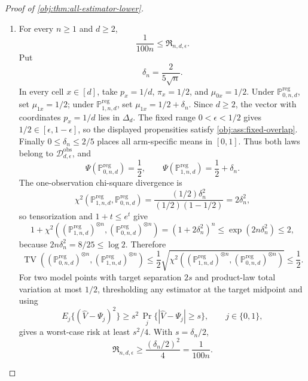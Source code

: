 \documentclass[11pt]{article}
\begin{document}
\begin{proof}[Proof of \cref{obj:thm:all-estimator-lower}]
\begin{enumerate}
Choose \(d_{\log}\) so that
\[
r\ge d_{\log}\quad\Longrightarrow\quad L_r\le\frac r2,
\]
and choose \(n_{\mathrm{tail}}\ge2\) so that, for every
\(n\ge n_{\mathrm{tail}}\),
\[
8\exp\{-n(1-\log2)\}\le\frac{\gamma_{\mathrm{JHW}}}{2n},
\qquad
8\exp\{-n(1-\log2)\}\le\frac{\gamma_{\mathrm{JHW}}}{2}.
\]
Set
\[
d_\star=\max\{d_{\mathrm{dense}},d_{\log}\},
\qquad
\Xi_\star=\max\{d_\star,n_{\mathrm{tail}}\},
\]
and
\[
c_\epsilon=
\min\left\{
\gamma_{\mathrm{dense},\epsilon},
\frac{\gamma_{\mathrm{JHW}}}{64},
\frac{1}{100\Xi_\star}
\right\}>0.
\]

\item
For every \(n\ge1\) and \(d\ge2\),
\[
\frac{1}{100n}\le \mathfrak R_{n,d,\epsilon}.
\]
Put
\[
\delta_n=\frac{2}{5\sqrt n}.
\]
In every cell \(x\in[d]\), take \(p_x=1/d\), \(\pi_x=1/2\), and
\(\mu_{0x}=1/2\).  Under \(\mathbb P^{\mathrm{reg}}_{0,n,d}\), set
\(\mu_{1x}=1/2\); under \(\mathbb P^{\mathrm{reg}}_{1,n,d}\), set
\(\mu_{1x}=1/2+\delta_n\).  Since \(d\ge2\), the vector with coordinates \(p_x=1/d\) lies in
\(\Delta_d\).  The fixed range \(0<\epsilon<1/2\) gives
\(1/2\in[\epsilon,1-\epsilon]\), so the displayed propensities satisfy
\cref{obj:ass:fixed-overlap}.  Finally \(0\le\delta_n\le2/5\) places all
arm-specific means in \([0,1]\).  Thus both laws belong to
\(\mathcal D_{d,\epsilon}^{\mathrm{obs}}\), and
\[
\Psi(\mathbb P^{\mathrm{reg}}_{0,n,d})=\frac12,
\qquad
\Psi(\mathbb P^{\mathrm{reg}}_{1,n,d})=\frac12+\delta_n .
\]
The one-observation chi-square divergence is
\[
\chi^2(\mathbb P^{\mathrm{reg}}_{1,n,d},\mathbb P^{\mathrm{reg}}_{0,n,d})
=
\frac{(1/2)\delta_n^2}{(1/2)(1-1/2)}
=
2\delta_n^2,
\]
so tensorization and \(1+t\le e^t\) give
\[
1+
\chi^2\!\left(
(\mathbb P^{\mathrm{reg}}_{1,n,d})^{\otimes n},
(\mathbb P^{\mathrm{reg}}_{0,n,d})^{\otimes n}
\right)
=
(1+2\delta_n^2)^n
\le
\exp(2n\delta_n^2)
\le
2,
\]
because \(2n\delta_n^2=8/25\le\log2\).  Therefore
\[
\operatorname{TV}\!\left(
(\mathbb P^{\mathrm{reg}}_{0,n,d})^{\otimes n},
(\mathbb P^{\mathrm{reg}}_{1,n,d})^{\otimes n}
\right)
\le
\frac12
\sqrt{
\chi^2\!\left(
(\mathbb P^{\mathrm{reg}}_{1,n,d})^{\otimes n},
(\mathbb P^{\mathrm{reg}}_{0,n,d})^{\otimes n}
\right)}
\le
\frac12 .
\]
For two model points with target separation \(2s\) and product-law total
variation at most \(1/2\), thresholding any estimator at the target midpoint
and using
\[
E_j\{(\widehat V-\Psi_j)^2\}
\ge
s^2\,\Pr_j\{|\widehat V-\Psi_j|\ge s\},
\qquad j\in\{0,1\},
\]
gives a worst-case risk at least \(s^2/4\).  With \(s=\delta_n/2\),
\[
\mathfrak R_{n,d,\epsilon}
\ge
\frac{(\delta_n/2)^2}{4}
=
\frac{1}{100n}.
\]


\end{enumerate}
\end{proof}
\end{document}
